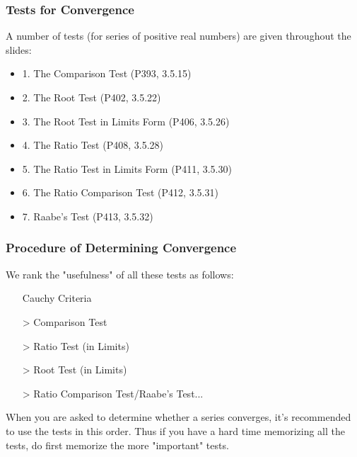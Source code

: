 \documentclass{beamer}
\begin{document}
\begin{frame}
    \frametitle{Tests for Convergence}
\hspace{1em}
A number of tests (for series of positive real numbers) are given
throughout the slides:
\begin{itemize}
    \item 1. The Comparison Test (P393, 3.5.15)
    \item 2. The Root Test (P402, 3.5.22)
    \item 3. The Root Test in Limits Form (P406, 3.5.26)
    \item 4. The Ratio Test (P408, 3.5.28)
    \item 5. The Ratio Test in Limits Form (P411, 3.5.30)
    \item 6. The Ratio Comparison Test (P412, 3.5.31)
    \item 7. Raabe’s Test (P413, 3.5.32)
\end{itemize}



\end{frame}

\begin{frame}
    \frametitle{Procedure of Determining Convergence}
\hspace{1em}We rank the "usefulness" of all these tests as follows:
\begin{center}
\begin{itemize}
    \item[] Cauchy Criteria
    \item[>] Comparison Test
    \item[>] Ratio Test (in Limits)
    \item[>] Root Test (in Limits)
    \item[>] Ratio Comparison Test/Raabe’s Test...  
\end{itemize}
\end{center}
\par
\hspace{1em}
When you are asked to determine whether a series converges, it’s
recommended to use the tests in this order. Thus if you have a hard time
memorizing all the tests, do first memorize the more "important" tests.
    
\end{frame}
\end{document}
